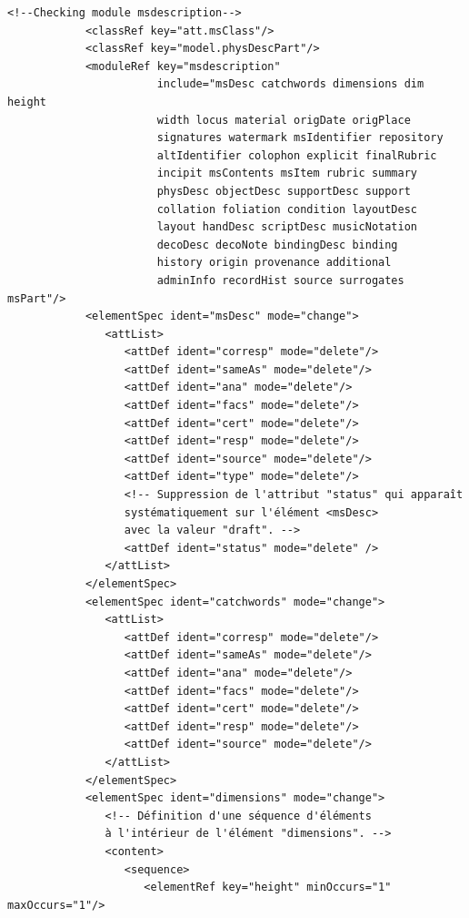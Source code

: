 \documentclass[a4paper,12pt,twoside]{book}
\begin{document}
	\begin{verbatim}
<!--Checking module msdescription-->
            <classRef key="att.msClass"/>
            <classRef key="model.physDescPart"/>
            <moduleRef key="msdescription"
                       include="msDesc catchwords dimensions dim height 
                       width locus material origDate origPlace 
                       signatures watermark msIdentifier repository 
                       altIdentifier colophon explicit finalRubric 
                       incipit msContents msItem rubric summary 
                       physDesc objectDesc supportDesc support 
                       collation foliation condition layoutDesc 
                       layout handDesc scriptDesc musicNotation 
                       decoDesc decoNote bindingDesc binding 
                       history origin provenance additional 
                       adminInfo recordHist source surrogates msPart"/>
            <elementSpec ident="msDesc" mode="change">
               <attList>
                  <attDef ident="corresp" mode="delete"/>
                  <attDef ident="sameAs" mode="delete"/>
                  <attDef ident="ana" mode="delete"/>
                  <attDef ident="facs" mode="delete"/>
                  <attDef ident="cert" mode="delete"/>
                  <attDef ident="resp" mode="delete"/>
                  <attDef ident="source" mode="delete"/>
                  <attDef ident="type" mode="delete"/>
                  <!-- Suppression de l'attribut "status" qui apparaît 
                  systématiquement sur l'élément <msDesc> 
                  avec la valeur "draft". -->
                  <attDef ident="status" mode="delete" />          
               </attList>
            </elementSpec>
            <elementSpec ident="catchwords" mode="change">
               <attList>
                  <attDef ident="corresp" mode="delete"/>
                  <attDef ident="sameAs" mode="delete"/>
                  <attDef ident="ana" mode="delete"/>
                  <attDef ident="facs" mode="delete"/>
                  <attDef ident="cert" mode="delete"/>
                  <attDef ident="resp" mode="delete"/>
                  <attDef ident="source" mode="delete"/>
               </attList>
            </elementSpec>
            <elementSpec ident="dimensions" mode="change">
               <!-- Définition d'une séquence d'éléments
               à l'intérieur de l'élément "dimensions". -->
               <content>
                  <sequence>
                     <elementRef key="height" minOccurs="1" maxOccurs="1"/>

\end{verbatim}
\end{document}
